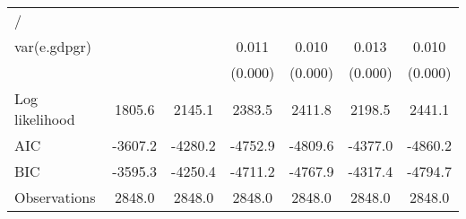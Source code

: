 \begin{table}[htbp]
\begin{tabular}{l*{6}{c}}
\hline
/                   &                     &                     &                     &                     &                     &                     \\
var(e.gdpgr)        &                     &                     &       0.011\sym{***}&       0.010\sym{***}&       0.013\sym{***}&       0.010\sym{***}\\
                    &                     &                     &     (0.000)         &     (0.000)         &     (0.000)         &     (0.000)         \\
\hline
Log likelihood      &      1805.6         &      2145.1         &      2383.5         &      2411.8         &      2198.5         &      2441.1         \\
AIC                 &     -3607.2         &     -4280.2         &     -4752.9         &     -4809.6         &     -4377.0         &     -4860.2         \\
BIC                 &     -3595.3         &     -4250.4         &     -4711.2         &     -4767.9         &     -4317.4         &     -4794.7         \\
Observations        &      2848.0         &      2848.0         &      2848.0         &      2848.0         &      2848.0         &      2848.0         \\
\hline\hline
\end{tabular}
\end{table}
